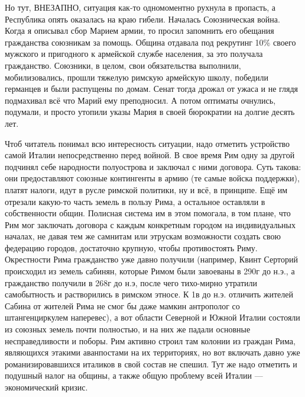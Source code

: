 Но тут, ВНЕЗАПНО, ситуация как-то одномоментно рухнула в пропасть, а Республика опять оказалась на краю гибели. Началась Союзническая война. Когда я описывал сбор Марием армии, то просил запомнить его обещания гражданства союзникам за помощь. Община отдавала под рекрутинг 10\% своего мужского и пригодного к армейской службе населения, за это получала гражданство. Союзники, в целом, свои обязательства выполнили, мобилизовались, прошли тяжелую римскую армейскую школу, победили германцев и были распущены по домам. Сенат тогда дрожал от ужаса и не глядя подмахивал всё что Марий ему преподносил. А потом оптиматы очнулись, подумали, и просто утопили указы Мария в своей бюрократии на долгие десять лет.


Чтоб читатель понимал всю интересность ситуации, надо отметить устройство самой Италии непосредственно перед войной. В свое время Рим одну за другой подчинял себе народности полуострова и заключал с ними договора. Суть такова: они предоставляют союзные контингенты в армию (те самые войска поддержки), платят налоги, идут в русле римской политики, ну и всё, в принципе. Ещё им отрезали какую-то часть земель в пользу Рима, а остальное оставляли в собственности общин. Полисная система им в этом помогала, в том плане, что Рим мог заключать договора с каждым конкретным городом на индивидуальных началах, не давая тем же самнитам или этрускам возможности создать свою федерацию городов, достаточно крупную, чтобы противостоять Риму. Окрестности Рима гражданство уже давно получили (например, Квинт Серторий происходил из земель сабинян, которые Римом были завоеваны в 290г до н.э., а гражданство получили в 268г до н.э, после чего тихо-мирно утратили самобытность и растворились в римском этносе. К 1в до н.э. отличить жителей Сабина от жителей Рима не смог бы даже мамкин антрополог со штангенциркулем наперевес), а вот области Северной и Южной Италии состояли из союзных земель почти полностью, и на них же падали основные несправедливости и поборы. Рим активно строил там колонии из граждан Рима, являющихся этакими аванпостами на их территориях, но вот включать давно уже романизировавшихся италиков в свой состав не спешил. Тут же надо отметить и подушный налог на общины, а также общую проблему всей Италии — экономический кризис.


